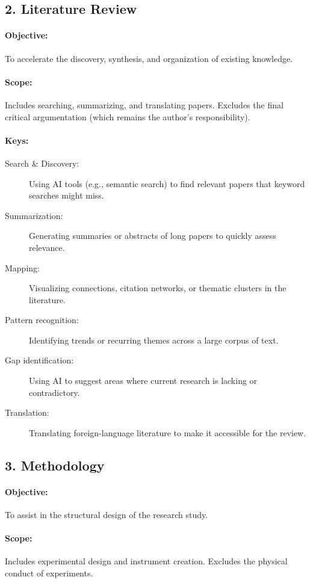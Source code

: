 \subsection*{2. Literature Review}
\paragraph{Objective:} To accelerate the discovery, synthesis, and organization of existing knowledge.
\paragraph{Scope:} Includes searching, summarizing, and translating papers.
Excludes the final critical argumentation (which remains the author's responsibility).
\paragraph{Keys:}
\begin{description}
    \item[Search \& Discovery:] Using \gls{AI} tools (e.g., semantic search) to find relevant papers that keyword searches might miss.
    \item[Summarization:] Generating summaries or abstracts of long papers to quickly assess relevance.
    \item[Mapping:] Visualizing connections, citation networks, or thematic clusters in the literature.
    \item[Pattern recognition:] Identifying trends or recurring themes across a large corpus of text.
    \item[Gap identification:] Using \gls{AI} to suggest areas where current research is lacking or contradictory.
    \item[Translation:] Translating foreign-language literature to make it accessible for the review.
\end{description}

\subsection*{3. Methodology}
\paragraph{Objective:} To assist in the structural design of the research study.
\paragraph{Scope:} Includes experimental design and instrument creation.
Excludes the physical conduct of experiments.
